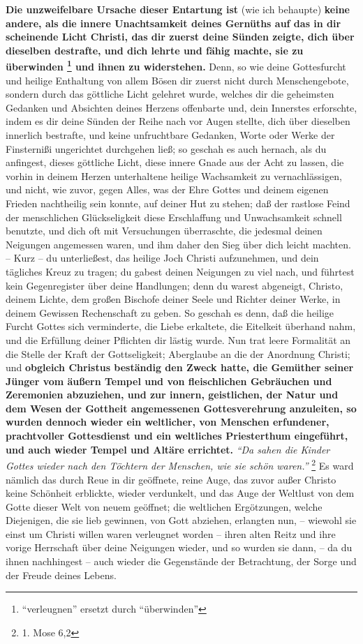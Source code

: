 \textbf{Die unzweifelbare Ursache dieser Entartung ist} (wie ich behaupte)
\textbf{keine andere,
als die innere Unachtsamkeit deines Gernüths auf das in dir scheinende Licht
Christi, das dir zuerst deine Sünden zeigte, dich über dieselben destrafte, und
dich lehrte und fähig machte, sie zu überwinden \footnote{"`verleugnen"'
ersetzt durch "`überwinden"'} und ihnen zu widerstehen.} Denn,
so wie deine Gottesfurcht und heilige Enthaltung von allem Bösen dir zuerst
nicht durch Menschengebote, sondern durch das göttliche Licht gelehret wurde,
welches dir die geheimsten Gedanken und Absichten deines Herzens offenbarte und,
dein Innerstes erforschte, indem es dir deine Sünden der Reihe nach vor Augen
stellte, dich über dieselben innerlich bestrafte, und keine unfruchtbare
Gedanken, Worte oder Werke der Finsternißi ungerichtet durchgehen ließ; so
geschah es auch hernach, als du anfingest, dieses göttliche Licht, diese innere
Gnade aus der Acht zu lassen, die vorhin in deinem Herzen unterhaltene heilige
Wachsamkeit zu vernachlässigen, und nicht, wie zuvor, gegen Alles, was der Ehre
Gottes und deinem eigenen Frieden nachtheilig sein konnte, auf deiner Hut zu
stehen; daß der rastlose Feind der menschlichen Glückseligkeit diese
Erschlaffung und Unwachsamkeit schnell benutzte, und dich oft mit Versuchungen
überraschte, die jedesmal deinen Neigungen angemessen waren, und ihm daher den
Sieg über dich leicht machten. -- Kurz -- du unterließest, das heilige Joch
Christi aufzunehmen, und dein tägliches Kreuz zu tragen; du gabest deinen
Neigungen zu viel nach, und führtest kein Gegenregister über deine Handlungen;
denn du warest abgeneigt, Christo, deinem Lichte, dem großen Bischofe deiner
Seele und Richter deiner Werke, in deinem Gewissen Rechenschaft zu geben. So
geschah es denn, daß die heilige Furcht Gottes sich verminderte, die Liebe
erkaltete, die Eitelkeit überhand nahm, und die Erfüllung deiner Pflichten dir
lästig wurde. Nun trat leere Formalität an die Stelle der Kraft der
Gottseligkeit; Aberglaube an die der Anordnung Christi; und \textbf{obgleich
Christus
beständig den Zweck hatte, die Gemüther seiner Jünger vom äußern Tempel und von
fleischlichen Gebräuchen und Zeremonien abzuziehen, und zur innern, geistlichen,
der Natur und dem Wesen der Gottheit angemessenen Gottesverehrung anzuleiten, so
wurden dennoch wieder ein weltlicher, von Menschen erfundener, prachtvoller
Gottesdienst  und ein weltliches Priesterthum
 eingeführt, und auch wieder Tempel 
und Altäre errichtet.}
\textit{"`Da sahen die Kinder Gottes wieder nach den Töchtern der
Menschen, wie sie schön waren."'}
\footnote{1. Mose 6,2}
Es ward nämlich das durch
Reue in dir geöffnete, reine Auge, das zuvor außer Christo keine Schönheit
erblickte, wieder verdunkelt, und das Auge der Weltlust von dem Gotte dieser
Welt von neuem geöffnet; die weltlichen Ergötzungen, welche Diejenigen, die sie
lieb gewinnen, von Gott abziehen, erlangten nun, -- wiewohl sie einst um Christi
willen waren verleugnet worden -- ihren alten Reitz und ihre vorige Herrschaft
über deine Neigungen wieder, und so wurden sie dann, -- da du ihnen nachhingest
-- auch wieder die Gegenstände der Betrachtung, der Sorge und der Freude deines
Lebens.

